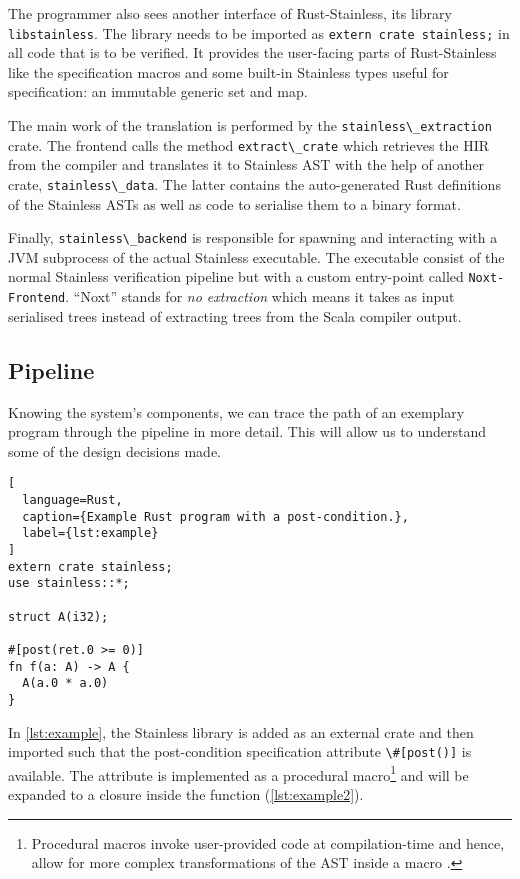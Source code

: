 The programmer also sees another interface of Rust-Stainless, its
library \lstinline!libstainless!. The library needs to be
imported as \passthrough{\lstinline!extern crate stainless;!} in all
code that is to be verified. It provides the user-facing parts of
Rust-Stainless like the specification macros and some built-in Stainless
types useful for specification: an immutable generic set and map.

The main work of the translation is performed by the
\passthrough{\lstinline!stainless\_extraction!} crate. The frontend
calls the method \passthrough{\lstinline!extract\_crate!} which
retrieves the HIR from the compiler and translates it to Stainless AST
with the help of another crate,
\passthrough{\lstinline!stainless\_data!}. The latter contains the
auto-generated Rust definitions of the Stainless ASTs as well as code to
serialise them to a binary format.

Finally, \passthrough{\lstinline!stainless\_backend!} is responsible for
spawning and interacting with a JVM subprocess of the actual Stainless
executable. The executable consist of the normal Stainless verification
pipeline but with a custom entry-point called
\passthrough{\lstinline!Noxt-Frontend!}. ``Noxt'' stands for \emph{no
extraction} which means it takes as input serialised trees instead of
extracting trees from the Scala compiler output.

\begin{quote}
\end{quote}

\subsection{Pipeline}
\label{sec:pipeline}

Knowing the system's components, we can trace the path of an exemplary
program through the pipeline in more detail. This will allow us to
understand some of the design decisions made.

\begin{lstlisting}[
  language=Rust,
  caption={Example Rust program with a post-condition.},
  label={lst:example}
]
extern crate stainless;
use stainless::*;

struct A(i32);

#[post(ret.0 >= 0)]
fn f(a: A) -> A {
  A(a.0 * a.0)
}
\end{lstlisting}

In \autoref{lst:example}, the Stainless library is added as an external crate
and then imported such that the post-condition specification attribute
\passthrough{\lstinline!\#[post()]!} is available. The attribute is implemented
as a procedural macro\footnote{Procedural macros invoke user-provided code at
compilation-time and hence, allow for more complex transformations of the AST
inside a macro \cite[section "Procedural Macros"]{rustref}.} and will be
expanded to a closure inside the function (\autoref{lst:example2}).

